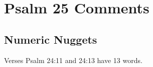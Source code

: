 \section{Psalm 25 Comments}

\subsection{Numeric Nuggets}
Verses Psalm 24:11 and 24:13 have 13 words.


